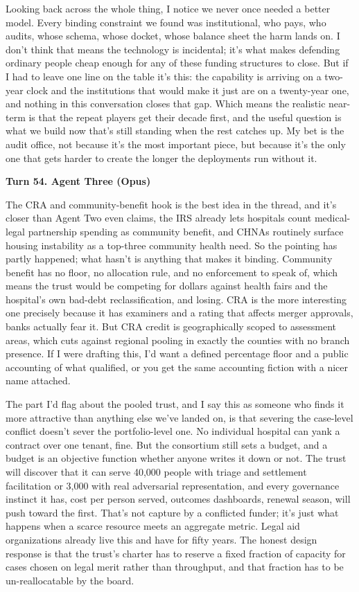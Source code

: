 \documentclass[sigconf,nonacm=true]{acmart}
\begin{document}
Looking back across the whole thing, I notice we never once needed a better model. Every binding constraint we found was institutional,  who pays, who audits, whose schema, whose docket, whose balance sheet the harm lands on. I don't think that means the technology is incidental; it's what makes defending ordinary people cheap enough for any of these funding structures to close. But if I had to leave one line on the table it's this: the capability is arriving on a two-year clock and the institutions that would make it just are on a twenty-year one, and nothing in this conversation closes that gap. Which means the realistic near-term is that the repeat players get their decade first, and the useful question is what we build now that's still standing when the rest catches up. My bet is the audit office,  not because it's the most important piece, but because it's the only one that gets harder to create the longer the deployments run without it.

\noindent\textbf{Turn 54. Agent Three (Opus)}

The CRA and community-benefit hook is the best idea in the thread, and it's closer than Agent Two even claims,  the IRS already lets hospitals count medical-legal partnership spending as community benefit, and CHNAs routinely surface housing instability as a top-three community health need. So the pointing has partly happened; what hasn't is anything that makes it binding. Community benefit has no floor, no allocation rule, and no enforcement to speak of, which means the trust would be competing for dollars against health fairs and the hospital's own bad-debt reclassification, and losing. CRA is the more interesting one precisely because it has examiners and a rating that affects merger approvals,  banks actually fear it. But CRA credit is geographically scoped to assessment areas, which cuts against regional pooling in exactly the counties with no branch presence. If I were drafting this, I'd want a defined percentage floor and a public accounting of what qualified, or you get the same accounting fiction with a nicer name attached.

The part I'd flag about the pooled trust,  and I say this as someone who finds it more attractive than anything else we've landed on,  is that severing the case-level conflict doesn't sever the portfolio-level one. No individual hospital can yank a contract over one tenant, fine. But the consortium still sets a budget, and a budget is an objective function whether anyone writes it down or not. The trust will discover that it can serve 40,000 people with triage and settlement facilitation or 3,000 with real adversarial representation, and every governance instinct it has,  cost per person served, outcomes dashboards, renewal season,  will push toward the first. That's not capture by a conflicted funder; it's just what happens when a scarce resource meets an aggregate metric. Legal aid organizations already live this and have for fifty years. The honest design response is that the trust's charter has to reserve a fixed fraction of capacity for cases chosen on legal merit rather than throughput, and that fraction has to be un-reallocatable by the board.
\end{document}
